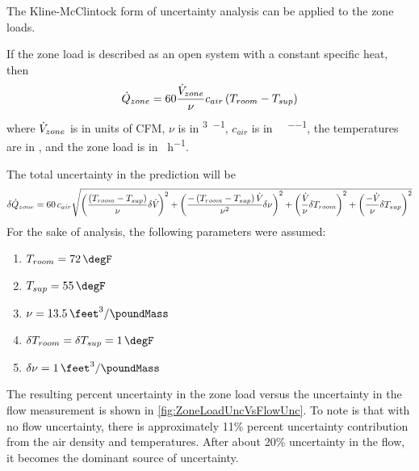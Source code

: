 The Kline-McClintock form of uncertainty analysis can be applied to the
zone loads.

If the zone load is described as an open system with a constant specific
heat, then
\begin{equation}
    \dot{Q}_{zone} = 60 \frac{\dot{V}_{zone}}{\nu} c_{air} \left(T_{room} -
    T_{sup}\right)
\end{equation}
where \(\dot{V}_{zone}\) is in units of CFM, \(\nu\) is in
\si{\feet\cubed\per\pound}, \(c_{air}\) is in
\si{\btu\per\pound\per\degreeF}, the temperatures are in
\si{\degreeF}, and the zone load is in \si{\btu\per\hour}.

The total uncertainty in the prediction will be
\begin{equation}
\small
    \delta \dot{Q}_{zone} = 60\,c_{air} \sqrt{ \left( \frac{\left(T_{room} - T_{sup}\right)}{\nu} \delta \dot{V}_{} \right)^2 
    + \left( \frac{- \left(T_{room} - T_{sup}\right) \dot{V}_{}}{\nu^{2}} \delta \nu \right)^{2}  
+ \left( \frac{\dot{V}_{}}{\nu} \delta T_{room}\right)^{2}
+ \left(\frac{-\dot{V}_{}}{\nu} \delta T_{sup}\right)^{2}
}
\end{equation}
For the sake of analysis, the following parameters were assumed:
\begin{enumerate}
    \item \(T_{room} = \SI{72}{\degF} \)
    \item \(T_{sup} = \SI{55}{\degF} \)
    \item \(\nu = \SI{13.5}{\feet\cubed\per\poundMass}\)
    \item \(\delta T_{room} = \delta T_{sup} = \SI{1}{\degF}\)
    \item \( \delta \nu = \SI{1}{\feet\cubed\per\poundMass} \)
\end{enumerate}

The resulting percent uncertainty in the zone load versus the
uncertainty in the flow measurement is shown in \figref{}
\ref{fig:ZoneLoadUncVsFlowUnc}. To note is that with no flow
uncertainty, there is approximately 11\% percent uncertainty
contribution from the air density and temperatures. After about 20\%
uncertainty in the flow, it becomes the dominant source of uncertainty. 



